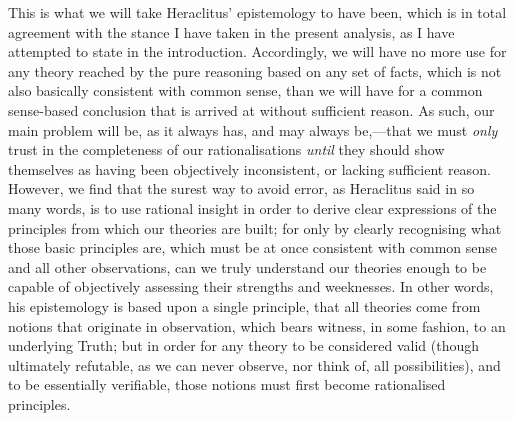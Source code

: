 This is what we will take Heraclitus' epistemology to have been, which is in total agreement with the stance I have taken in the present analysis, as I have attempted to state in the introduction. Accordingly, we will have no more use for any theory reached by the pure reasoning based on any set of facts, which is not also basically consistent with common sense, than we will have for a common sense-based conclusion that is arrived at without sufficient reason. As such, our main problem will be, as it always has, and may always be,---that we must \textit{only} trust in the completeness of our rationalisations \textit{until} they should show themselves as having been objectively inconsistent, or lacking sufficient reason. However, we find that the surest way to avoid error, as Heraclitus said in so many words, is to use rational insight in order to derive clear expressions of the principles from which our theories are built; for only by clearly recognising what those basic principles are, which must be at once consistent with common sense and all other observations, can we truly understand our theories enough to be capable of objectively assessing their strengths and weeknesses. In other words, his epistemology is based upon a single principle, that all theories come from notions that originate in observation, which bears witness, in some fashion, to an underlying Truth; but in order for any theory to be considered valid (though ultimately refutable, as we can never observe, nor think of, all possibilities), and to be essentially verifiable, those notions must first become rationalised principles.

